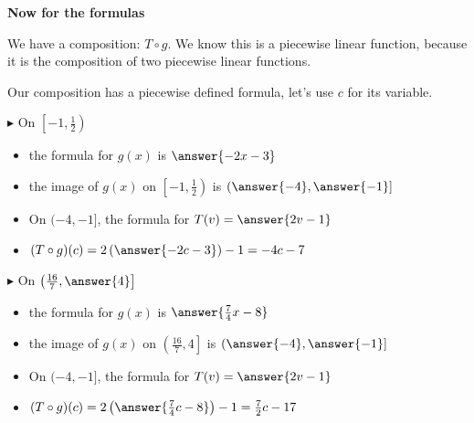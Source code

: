 \documentclass{ximera}
\begin{document}
\begin{explanation} \textbf{\textcolor{red!75!green}{Now for the formulas}} 




We have a composition: $T \circ g$.  We know this is a piecewise linear function, because it is the composition of two piecewise linear functions. 

Our composition has a piecewise defined formula, let's use $c$ for its variable. 





$\blacktriangleright$ On $\left[ -1, \frac{1}{2} \right)$




\begin{itemize}

\item the formula for $g(x)$ is $\answer{-2x-3}$
\item the image of $g(x)$ on $\left[ -1, \frac{1}{2} \right)$ is $\left( \answer{-4}, \answer{-1} \right]$
\item On $( -4, -1 ]$, the formula for $T(v) = \answer{2v-1}$  \\
\item $(T \circ g)(c) = 2 \left(\answer{-2c-3}\right) - 1 = -4c - 7$ \\


\end{itemize}








$\blacktriangleright$ On $\left( \frac{16}{7}, \answer{4} \right]$



\begin{itemize}

\item the formula for $g(x)$ is $\answer{\frac{7}{4}x - 8}$
\item the image of $g(x)$ on $\left( \frac{16}{7}, 4 \right]$ is $\left( \answer{-4}, \answer{-1} \right]$
\item On $( -4, -1 ]$, the formula for $T(v) = \answer{2v-1}$  \\
\item $(T \circ g)(c) = 2\left(\answer{\frac{7}{4}c - 8}\right) - 1 = \frac{7}{2}c - 17$ \\


\end{itemize}













\end{explanation}
\end{document}
